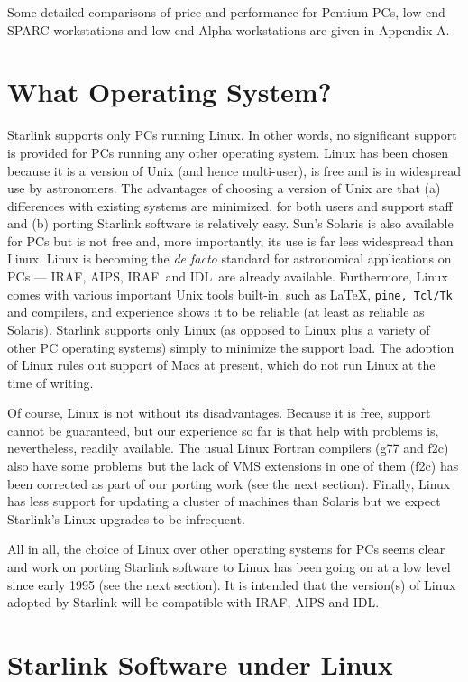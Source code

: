 \documentclass[twoside,11pt]{article}
\newcommand{\htmladdnormallink}[2]{#1}
\newcommand{\AIPS}{\small{AIPS}\normalsize}
\newcommand{\AIPSref}{\htmladdnormallink{\AIPS}{http://www.aips.nrao.edu/}}
\newcommand{\IDL}{\small{IDL}\normalsize}
\newcommand{\IDLref}{\htmladdnormallink{\IDL}{http://rsinc.com/idl/}}
\newcommand{\IRAF}{\small{IRAF}\normalsize}
\newcommand{\IRAFref}{\htmladdnormallink{\IRAF}{http://iraf.noao.edu/iraf-homepage.html}}
\newcommand{\MIDAS}{\small{IRAF}\normalsize}
\newcommand{\MIDASref}{\htmladdnormallink{\MIDAS}{http://www.eso.org/sci/data-processing/software/esomidas/}}
\begin{document}
Some detailed comparisons of price and performance for Pentium PCs,
low-end SPARC workstations and low-end Alpha workstations are given in
Appendix A.


\section{What Operating System?}

Starlink supports only PCs running Linux.  In other
words, no significant support is provided for PCs
running any other operating system.  Linux
has been chosen because it is a version of Unix (and hence multi-user),
is free and is in widespread use by astronomers.  The advantages of
choosing a version of Unix are that (a)
differences with existing systems are minimized, for both users and
support staff and (b) porting Starlink software is relatively easy. Sun's
Solaris is also available for PCs but is not free and, more importantly,
its use is far less widespread than Linux. Linux is becoming the {\em
de facto} standard for astronomical applications on PCs --- \IRAFref,
\AIPSref, \MIDASref\ and \IDLref\ are already available.  Furthermore,
Linux comes with
various important Unix tools built-in, such as \LaTeX, {\tt pine, Tcl/Tk}
and compilers, and experience shows it to be reliable (at least as reliable
as Solaris).  Starlink supports only Linux
(as opposed to Linux plus a variety of other PC operating systems)
simply to minimize the support load.  The adoption of Linux rules out
support of Macs at present, which do not run Linux at the time of writing.

Of course, Linux is not without its disadvantages.  Because it is free,
support cannot be guaranteed, but our experience so far is that help
with problems is, nevertheless, readily available.  The usual Linux Fortran
compilers (g77 and f2c) also have some problems but the lack of VMS
extensions in one of them (f2c)  has been corrected as part of our
porting work (see the next section).  Finally, Linux has less support
for updating a cluster of machines than Solaris but we expect
Starlink's Linux upgrades to be infrequent.

All in all, the choice of Linux over other operating
systems for PCs seems clear and work on porting
Starlink software to Linux has been going on at a low level since
early 1995 (see the next section).  It is intended that the version(s)
of Linux adopted by Starlink will be compatible with IRAF, AIPS and IDL.

\section{Starlink Software under Linux}
\end{document}
